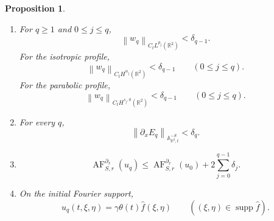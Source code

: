 \documentclass[12pt,reqno,letterpaper]{amsart}
\numberwithin{equation}{section}
\newtheorem{proposition}[theorem]{Proposition}
\theoremstyle{definition}
\newcommand{\R}{\mathbb R}
\newcommand{\A}{\mathbb A}
\newcommand{\supp}{\operatorname{supp}}
\newcommand{\norm}[1]{\left\lVert #1\right\rVert}
\begin{document}
\begin{proposition}
\begin{enumerate}[label=\textup{(\roman*)}]
 \item For $q\geq1$ and $0\leq j\leq q$,
 \begin{equation*}
  \norm{w_q}_{C_tL^{p_j}(\R^2)}<\delta_{q-1}.
 \end{equation*}
 For the isotropic profile,
 \begin{equation}\label{eq:Euclidean-induction-Sobolev-diagonal}
  \norm{w_q}_{C_tH^{\alpha_j}(\R^2)}
  <\delta_{q-1}
  \qquad(0\leq j\leq q).
 \end{equation}
 For the parabolic profile,
 \begin{equation}\label{eq:Euclidean-induction-parabolic-Sobolev-diagonal}
  \norm{w_q}_{C_tH^{s_j,0}(\R^2)}
  <\delta_{q-1}
  \qquad(0\leq j\leq q).
 \end{equation}

 \item For every $q$,
 \begin{equation}\label{eq:Euclidean-induction-error}
  \norm{\partial_xE_q}_{\A^{-S}_{\R^2,t}}<\delta_q.
 \end{equation}

 \item
 \begin{equation}\label{eq:Euclidean-induction-AF-bound}
  \operatorname{AF}^{\partial_x}_{S,r}(u_q)
  \leq\operatorname{AF}^{\partial_x}_{S,r}(u_0)
   +2\sum_{j=0}^{q-1}\delta_j.
 \end{equation}

 \item On the initial Fourier support,
 \begin{equation}\label{eq:Euclidean-induction-preserved-support}
  \widehat u_q(t,\xi,\eta)=\gamma\theta(t)\widehat f(\xi,\eta)
  \qquad((\xi,\eta)\in\supp\widehat f).
 \end{equation}
\end{enumerate}
\end{proposition}
\end{document}
